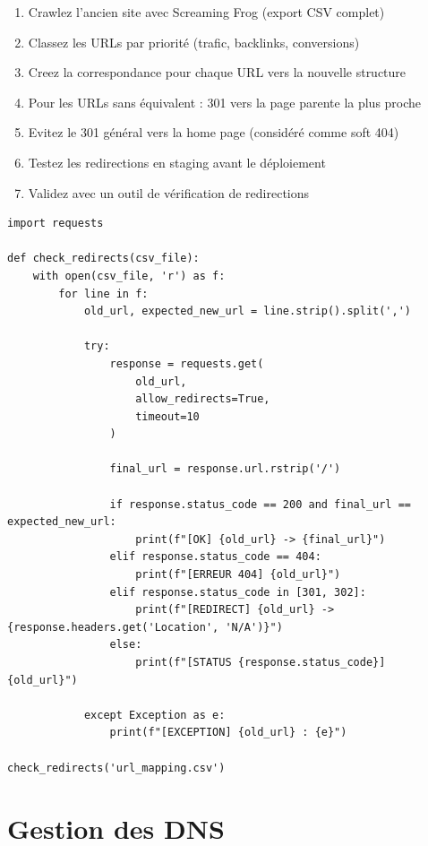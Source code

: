 \begin{enumerate}
    \item Crawlez l'ancien site avec Screaming Frog (export CSV complet)
    \item Classez les URLs par priorité (trafic, backlinks, conversions)
    \item Creez la correspondance pour chaque URL vers la nouvelle structure
    \item Pour les URLs sans équivalent : 301 vers la page parente la plus proche
    \item Evitez le 301 général vers la home page (considéré comme soft 404)
    \item Testez les redirections en staging avant le déploiement
    \item Validez avec un outil de vérification de redirections
\end{enumerate}

\begin{lstlisting}[style=code,caption={Script de vérification des redirections avec Python}]
import requests

def check_redirects(csv_file):
    with open(csv_file, 'r') as f:
        for line in f:
            old_url, expected_new_url = line.strip().split(',')

            try:
                response = requests.get(
                    old_url,
                    allow_redirects=True,
                    timeout=10
                )

                final_url = response.url.rstrip('/')

                if response.status_code == 200 and final_url == expected_new_url:
                    print(f"[OK] {old_url} -> {final_url}")
                elif response.status_code == 404:
                    print(f"[ERREUR 404] {old_url}")
                elif response.status_code in [301, 302]:
                    print(f"[REDIRECT] {old_url} -> {response.headers.get('Location', 'N/A')}")
                else:
                    print(f"[STATUS {response.status_code}] {old_url}")

            except Exception as e:
                print(f"[EXCEPTION] {old_url} : {e}")

check_redirects('url_mapping.csv')
\end{lstlisting}

\section{Gestion des DNS}


